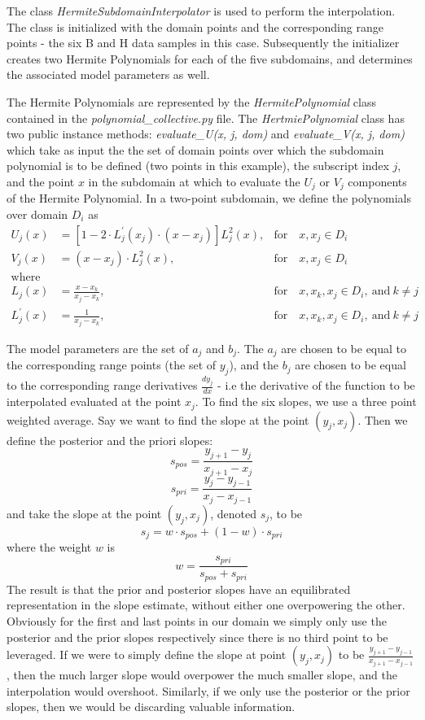 \documentclass[11pt]{article}
\begin{document}
The class \textit{HermiteSubdomainInterpolator} is used to perform the interpolation. The class is initialized with the domain points and the corresponding range points - the six B and H data samples in this case. Subsequently the initializer creates two Hermite Polynomials for each of the five subdomains, and determines the associated model parameters as well.

The Hermite Polynomials are represented by the \textit{HermitePolynomial} class contained in the \textit{polynomial\_collective.py} file. The \textit{HertmiePolynomial} class has two public instance methods: \textit{evaluate\_U(x, j, dom)} and \textit{evaluate\_V(x, j, dom)} which take as input the the set of domain points over which the subdomain polynomial is to be defined (two points in this example), the subscript index $j$, and the point $x$ in the subdomain at which to evaluate the $U_j$ or $V_j$ components of the Hermite Polynomial. In a two-point subdomain, we define the polynomials over domain $D_i$ as
\begin{align*}
    U_j(x) &= [1 - 2 \cdot L^{\prime}_j(x_j) \cdot (x-x_j)]L^2_j(x), &\text{for} \quad x, x_j \in D_i\\
    V_j(x) &= (x-x_j) \cdot L^2_j(x), &\text{for} \quad x, x_j \in D_i\\
    \text{where}&\\
    L_j(x) &= \frac{x - x_k}{x_j - x_k}, &\text{for} \quad x, x_k, x_j \in D_i, \ \text{and}\ k \neq j\\
    L^{\prime}_j(x) &= \frac{1}{x_j - x_k}, &\text{for} \quad x, x_k, x_j \in D_i, \ \text{and}\ k \neq j
\end{align*}

The model parameters are the set of $a_j$ and $b_j$. The $a_j$ are chosen to be equal to the corresponding range points (the set of $y_j$), and the $b_j$ are chosen to be equal to the corresponding range derivatives $\frac{d y_j}{d x}$ - i.e the derivative of the function to be interpolated evaluated at the point $x_j$. To find the six slopes, we use a three point weighted average. Say we want to find the slope at the point $(y_j, x_j)$. Then we define the posterior and the priori slopes:
$$s_{pos} = \frac{y_{j+1} - y_j}{x_{j+1} - x_j}$$
$$s_{pri} = \frac{y_{j} - y_{j-1}}{x_{j} - x_{j-1}}$$
and take the slope at the point $(y_j, x_j)$, denoted $s_j$, to be
$$\boxed{s_j = w \cdot s_{pos} + (1 - w) \cdot s_{pri}}$$
where the weight $w$ is
$$w = \frac{s_{pri}}{s_{pos} + s_{pri}}$$
The result is that the prior and posterior slopes have an equilibrated representation in the slope estimate, without either one overpowering the other. Obviously for the first and last points in our domain we simply only use the posterior and the prior slopes respectively since there is no third point to be leveraged. If we were to simply define the slope at point $(y_j, x_j)$ to be $\frac{y_{j+1} - y_{j-1}}{x_{j+1} - x_{j-1}}$, then the much larger slope would overpower the much smaller slope, and the interpolation would overshoot. Similarly, if we only use the posterior or the prior slopes, then we would be discarding valuable information.
\end{document}
